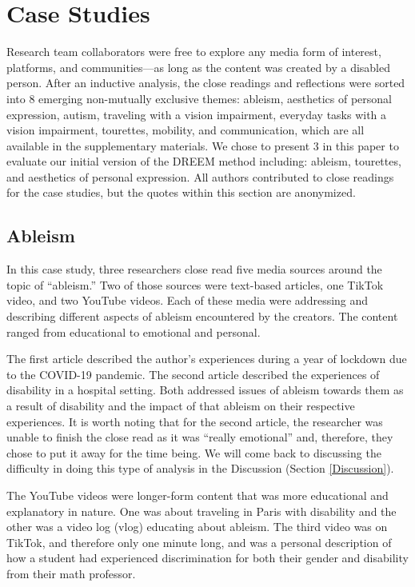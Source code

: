 \section{Case Studies} \label{CaseStudies}
 Research team collaborators were free to explore any media form of interest, platforms, and communities—as long as the content was created by a disabled person. After an inductive analysis, the close readings and reflections were sorted into 8 emerging non-mutually exclusive themes: ableism, aesthetics of personal expression, autism, traveling with a vision impairment, everyday tasks with a vision impairment, tourettes, mobility, and communication, which are all available in the supplementary materials. We chose to present 3 in this paper to evaluate our initial version of the DREEM method including: ableism, tourettes, and aesthetics of personal expression. All authors contributed to close readings for the case studies, but the quotes within this section are anonymized. 

\subsection{Ableism} \label{case:ableism}
In this case study, three researchers close read five media sources around the topic of ``ableism.'' Two of those sources were text-based articles, one TikTok video, and two YouTube videos. Each of these media were addressing and describing different aspects of ableism encountered by the creators. The content ranged from educational to emotional and personal.

The first article described the author's experiences during a year of lockdown due to the COVID-19 pandemic. The second article described the experiences of disability in a hospital setting. Both addressed issues of ableism towards them as a result of disability and the impact of that ableism on their respective experiences. It is worth noting that for the second article, the researcher was unable to finish the close read as it was ``really emotional'' and, therefore, they chose to put it away for the time being. We will come back to discussing the difficulty in doing this type of analysis in the Discussion (Section \ref{Discussion}). 

The YouTube videos were longer-form content that was more educational and explanatory in nature. One was about traveling in Paris with disability and the other was a video log (vlog) educating about ableism. The third video was on TikTok, and therefore only one minute long, and was a personal description of how a student had experienced discrimination for both their gender and disability from their math professor.

